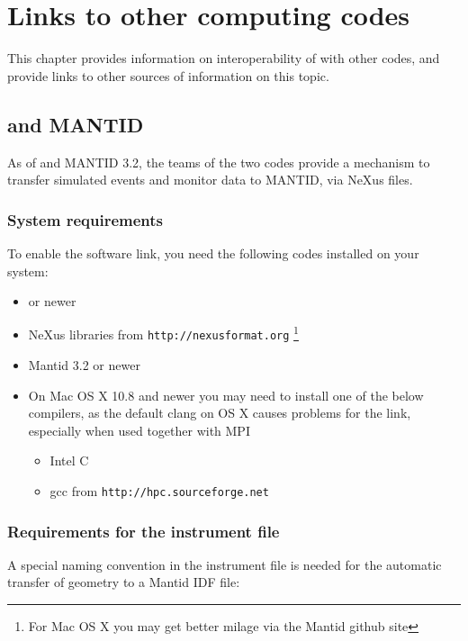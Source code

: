 \chapter{Links to other computing codes}

This chapter provides information on interoperability of \MCS with
other codes, and provide links to other sources of information on this topic.

\section{\MCS and MANTID}
As of  and MANTID 3.2, the teams of the two codes provide a mechanism to transfer simulated \MCS
events and monitor data to MANTID, via NeXus files.

\subsection{System requirements}
To enable the software link, you need the following codes installed on
your system:
\begin{itemize}
\item{ or newer}
\item{NeXus libraries from \verb+http://nexusformat.org+ \footnote{For Mac OS X you may get
    better milage via the Mantid github site}}
\item{Mantid 3.2 or newer}
\item{On Mac OS X 10.8 and newer you may need to install one of the
    below compilers, as the default clang on OS X causes problems for
    the link, especially when used together with MPI}
  \begin{itemize}
  \item{Intel C}
  \item{gcc from \verb+http://hpc.sourceforge.net+}
  \end{itemize}
\end{itemize}

\subsection{Requirements for the instrument file}
A special naming convention in the instrument file is needed for the
automatic transfer of geometry to a Mantid IDF file:

